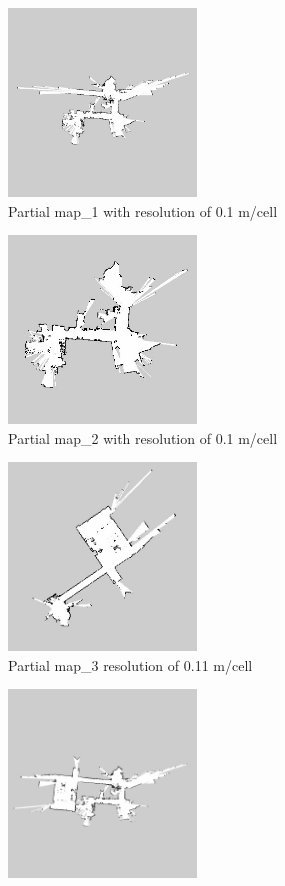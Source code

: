 \begin{figure}[H]
\begin{subfigure}{0.5\textwidth}
\includegraphics[width=0.9\linewidth, height=5cm]{figs/mit_results/b/partial_map_1.jpg} 
\caption{Partial map\_1 with resolution of 0.1 m/cell}
\label{fig:mit21}
\end{subfigure}
\begin{subfigure}{0.5\textwidth}
\includegraphics[width=0.9\linewidth, height=5cm]{figs/mit_results/b/partial_map_2.jpg} 
\caption{Partial map\_2 with resolution of 0.1 m/cell}
\label{fig:mit22}
\end{subfigure}
\begin{subfigure}{0.5\textwidth}
\includegraphics[width=0.9\linewidth, height=5cm]{figs/mit_results/b/partial_map_3.jpg} 
\caption{Partial map\_3 resolution of 0.11 m/cell}
\label{fig:mit23}
\end{subfigure}
\begin{subfigure}{0.5\textwidth}
\centering
\includegraphics[width=0.9\linewidth, height=5cm]{figs/mit_results/b/final_map.jpg} 

\end{subfigure}
\end{figure}
